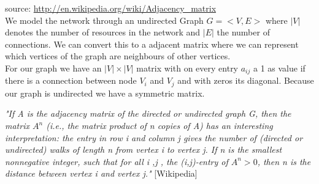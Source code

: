 
source: \url{http://en.wikipedia.org/wiki/Adjacency_matrix} \\
We model the network through an undirected Graph $G = < V, E> $ where $|V|$ denotes the number of resources in the network and $|E|$ the number of connections. We can convert this to a adjacent matrix where we can represent which vertices of the graph are neighbours of other vertices. \\
For our graph we have an $|V| \times |V|$ matrix with on every entry $a_{ij}$ a 1 as value if there is a connection between node $V_{i}$ and $V_{j}$ and with zeros its diagonal. Because our graph is undirected we have a symmetric matrix. 

\textit{"If \textit{A} is the adjacency matrix of the directed or undirected graph \textit{G}, then the matrix $A^{n}$ (i.e., the matrix product of n copies of \textit{A}) has an interesting interpretation: the entry in row i and column j gives the number of (directed or undirected) walks of length n from vertex i to vertex j. If n is the smallest nonnegative integer, such that for all i ,j , the (i,j)-entry of $A^{n} > 0$, then n is the distance between vertex i and vertex j."} [Wikipedia]

